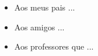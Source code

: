 \begin{itemize}
	\item Aos meus pais ...
	\item Aos amigos ...
	\item Aos professores que ...
\end{itemize}
